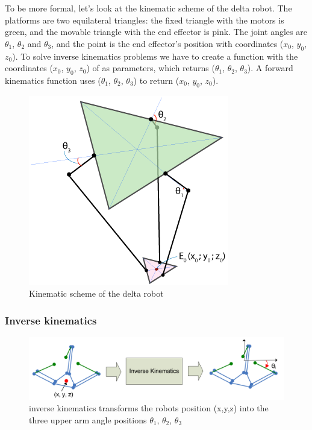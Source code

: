 To be more formal, let's look at the kinematic scheme of the delta robot. The platforms are two equilateral triangles: the fixed triangle with the motors is green, and the movable triangle with the end effector is pink. The joint angles are $\theta_{1}$, $\theta_{2}$ and $\theta_{3}$, and the point is the end effector’s position with coordinates ($x_{0}$, $y_{0}$, $z_{0}$).
To solve inverse kinematics problems we have to create a function with the coordinates ($x_{0}$, $y_{0}$, $z_{0}$) of as parameters, which returns ($\theta_{1}$, $\theta_{2}$, $\theta_{3}$). A forward kinematics function uses ($\theta_{1}$, $\theta_{2}$, $\theta_{3}$) to return ($x_{0}$, $y_{0}$, $z_{0}$).
\begin{figure}[H]
	\centering
	\includegraphics[width=\maxwidth{11cm}, keepaspectratio]{Chapters/Fig/kinematic_scheme.png}
	\caption{Kinematic scheme of the delta robot}
	\label{fig:kinematic_scheme}
\end{figure}
\subsubsection{Inverse kinematics}
\begin{figure}[H]
	\centering
	\includegraphics[width=\maxwidth{15cm}, keepaspectratio]{Chapters/Fig/inverse_kinematics.png}
	\caption{inverse kinematics transforms the robots position (x,y,z) into the three upper arm angle positions $\theta_{1}$, $\theta_{2}$, $\theta_{3}$}
	\label{fig:inverse_kinematics}
\end{figure}

